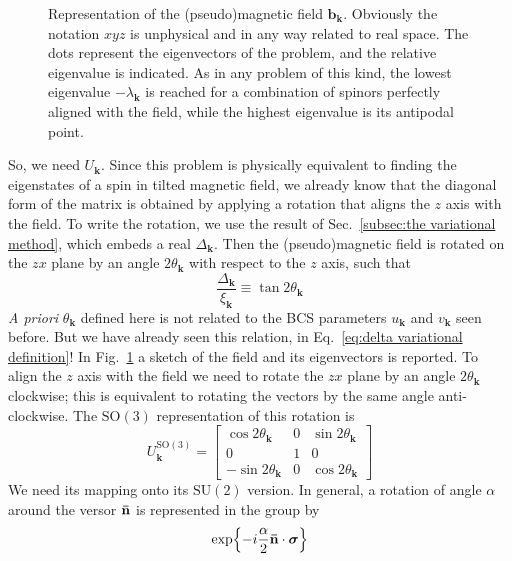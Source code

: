 \begin{figure}
	\centering
	
	\caption{Representation of the (pseudo)magnetic field $\mathbf{b}_\mathbf{k}$. Obviously the notation $xyz$ is unphysical and in any way related to real space. The dots represent the eigenvectors of the problem, and the relative eigenvalue is indicated. As in any problem of this kind, the lowest eigenvalue $-\lambda_\mathbf{k}$ is reached for a combination of spinors perfectly aligned with the field, while the highest eigenvalue is its antipodal point.}
	\label{fig:pseudo magnetic field}
\end{figure}

So, we need $U_\mathbf{k}$. Since this problem is physically equivalent to finding the eigenstates of a spin in tilted magnetic field, we already know that the diagonal form of the matrix is obtained by applying a rotation that aligns the $z$ axis with the field. To write the rotation, we use the result of Sec.~\ref{subsec:the variational method}, which embeds a real $\Delta_\mathbf{k}$. Then the (pseudo)magnetic field is rotated on the $zx$ plane by an angle $2\theta_\mathbf{k}$ with respect to the $z$ axis, such that
\begin{equation}\label{eq:tangent self consistent definition}
	\frac{\Delta_\mathbf{k}}{\xi_\mathbf{k}} \equiv  \tan 2\theta_\mathbf{k}
\end{equation}
\textit{A priori} $\theta_\mathbf{k}$ defined here is not related to the BCS parameters $u_\mathbf{k}$ and $v_\mathbf{k}$ seen before. But we have already seen this relation, in Eq.~\eqref{eq:delta variational definition}! In Fig.~\ref{fig:pseudo magnetic field} a sketch of the field and its eigenvectors is reported. To align the $z$ axis with the field we need to rotate the $zx$ plane by an angle $2\theta_\mathbf{k}$ clockwise; this is equivalent to rotating the vectors by the same angle anti-clockwise.
The $\mathrm{SO}(3)$ representation of this rotation is
\[
	U_\mathbf{k}^{\mathrm{SO}(3)} = \begin{bmatrix}
		\cos 2\theta_\mathbf{k} & 0 & \sin 2\theta_\mathbf{k} \\
		0 & 1 & 0 \\
		- \sin 2\theta_\mathbf{k} & 0 & \cos 2\theta_\mathbf{k}
	\end{bmatrix}
\]
We need its mapping onto its $\mathrm{SU}(2)$ version. In general, a rotation of angle $\alpha$ around the versor $\mathbf{\bar{n}}$ is represented in the group by
\[
	\exp{- i \frac{\alpha}{2} \ensuremath{\mathbf{\bar{n}}} \cdot \bm{\sigma}}
\]
